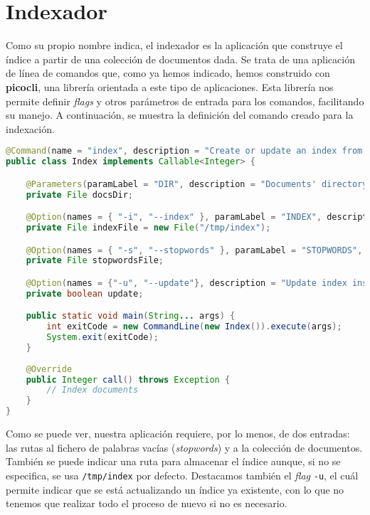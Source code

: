 \section{Indexador}

Como su propio nombre indica, el indexador es la aplicación que construye el índice a partir de una colección de documentos dada. Se trata de una aplicación de línea de comandos que, como ya hemos indicado, hemos construido con \textbf{picocli}, una librería orientada a este tipo de aplicaciones. Esta librería nos permite definir \textit{flags} y otros parámetros de entrada para los comandos, facilitando su manejo. A continuación, se muestra la definición del comando creado para la indexación.

\begin{lstlisting}[language=Java]
@Command(name = "index", description = "Create or update an index from a set of documents.", mixinStandardHelpOptions = true, version = "index 1.0")
public class Index implements Callable<Integer> {

    @Parameters(paramLabel = "DIR", description = "Documents' directory to be indexed.", arity = "1..1")
    private File docsDir;

    @Option(names = { "-i", "--index" }, paramLabel = "INDEX", description = "Path to index. Defaults to /tmp/index.")
    private File indexFile = new File("/tmp/index");

    @Option(names = { "-s", "--stopwords" }, paramLabel = "STOPWORDS", description = "Stopwords file.", required = true)
    private File stopwordsFile;

    @Option(names = {"-u", "--update"}, description = "Update index instead of creating a new one.")
    private boolean update;

    public static void main(String... args) {
        int exitCode = new CommandLine(new Index()).execute(args);
        System.exit(exitCode);
    }
    
    @Override
    public Integer call() throws Exception {
        // Index documents
    }
}
\end{lstlisting}

Como se puede ver, nuestra aplicación requiere, por lo menos, de dos entradas: las rutas al fichero de palabras vacías (\textit{stopwords}) y a la colección de documentos. También se puede indicar una ruta para almacenar el índice aunque, si no se especifica, se usa \verb|/tmp/index| por defecto. Destacamos también el \textit{flag} \verb|-u|, el cuál permite indicar que se está actualizando un índice ya existente, con lo que no tenemos que realizar todo el proceso de nuevo si no es necesario.

